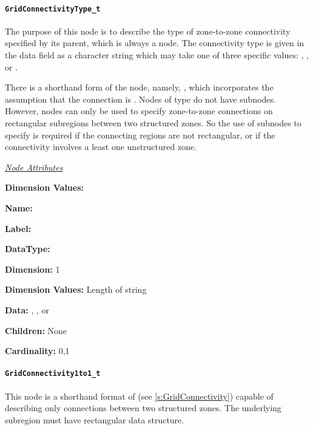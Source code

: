 \paragraph{\texttt{GridConnectivityType\_t}}

The purpose of this node is to describe the type of zone-to-zone
connectivity specified by its parent, which is always a
 node. The connectivity type is given in the
data field as a character string which may take one of three specific
values: , , or .

There is a shorthand form of the 
node, namely, , which
incorporates the assumption that the connection is
. Nodes of type 
do not have  subnodes. However,
 nodes can only be used to specify
zone-to-zone connections on rectangular subregions between two
structured zones. So the use of  subnodes
to specify  is required if the connecting regions
are not rectangular, or if the connectivity involves a least one
unstructured zone.

\textit{\uline{Node Attributes}}
\begin{Ventryic}{\textbf{Dimension Values:}}
\item [\textbf{Name:}]
\item [\textbf{Label:}]
\item [\textbf{DataType:}]
\item [\textbf{Dimension:}]
      1
\item [\textbf{Dimension Values:}]
      Length of string
\item [\textbf{Data:}]
      , , or 
\item [\textbf{Children:}]
      None
\item [\textbf{Cardinality:}]
      0,1
\end{Ventryic}

\paragraph{\texttt{GridConnectivity1to1\_t}}

This node is a shorthand format of 
(see \autoref{s:GridConnectivity}) capable of describing only
 connections between two structured zones. The
underlying subregion must have rectangular data structure.


